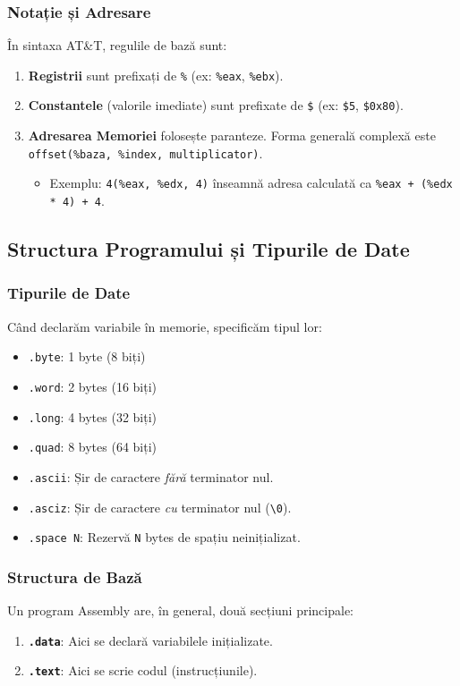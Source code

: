 \documentclass[12pt,a4paper]{article}
\begin{document}
\subsubsection{Notație și Adresare}
În sintaxa AT\&T, regulile de bază sunt:
\begin{enumerate}
    \item \textbf{Registrii} sunt prefixați de \texttt{\%} (ex: \texttt{\%eax}, \texttt{\%ebx}).
    \item \textbf{Constantele} (valorile imediate) sunt prefixate de \texttt{\$} (ex: \texttt{\$5}, \texttt{\$0x80}).
    \item \textbf{Adresarea Memoriei} folosește paranteze. Forma generală complexă este \texttt{offset(\%baza, \%index, multiplicator)}.
    \begin{itemize}
        \item Exemplu: \texttt{4(\%eax, \%edx, 4)} înseamnă adresa calculată ca \texttt{\%eax + (\%edx * 4) + 4}.
    \end{itemize}
\end{enumerate}

\subsection{Structura Programului și Tipurile de Date}

\subsubsection{Tipurile de Date}
Când declarăm variabile în memorie, specificăm tipul lor:
\begin{itemize}
    \item \texttt{.byte}: 1 byte (8 biți)
    \item \texttt{.word}: 2 bytes (16 biți)
    \item \texttt{.long}: 4 bytes (32 biți)
    \item \texttt{.quad}: 8 bytes (64 biți)
    \item \texttt{.ascii}: Șir de caractere \textit{fără} terminator nul.
    \item \texttt{.asciz}: Șir de caractere \textit{cu} terminator nul (\texttt{\textbackslash 0}).
    \item \texttt{.space N}: Rezervă \texttt{N} bytes de spațiu neinițializat.
\end{itemize}

\subsubsection{Structura de Bază}
Un program Assembly are, în general, două secțiuni principale:
\begin{enumerate}
    \item \textbf{\texttt{.data}}: Aici se declară variabilele inițializate.
    \item \textbf{\texttt{.text}}: Aici se scrie codul (instrucțiunile).
\end{enumerate}
\end{document}
